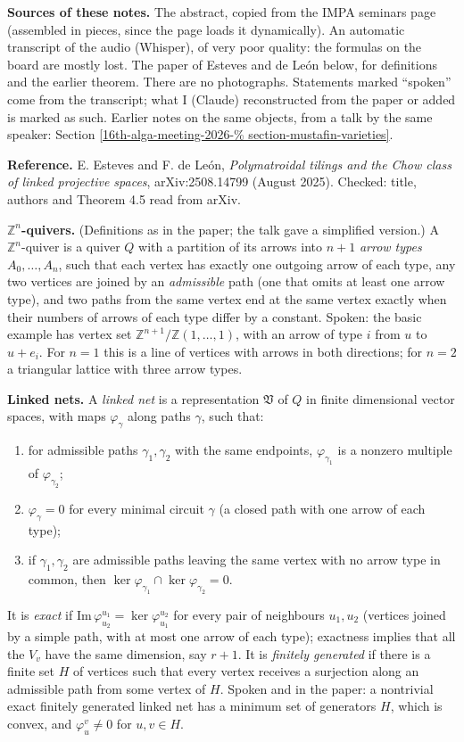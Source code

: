\medskip\noindent
{\bf Sources of these notes.} The abstract,
copied from the IMPA seminars page (assembled
in pieces, since the page loads it
dynamically). An automatic transcript of the
audio (Whisper), of very poor quality: the
formulas on the board are mostly lost. The
paper of Esteves and de Le\'on below, for
definitions and the earlier theorem. There
are no photographs. Statements marked
``spoken'' come from the transcript; what I
(Claude) reconstructed from the paper or
added is marked as such. Earlier notes on the
same objects, from a talk by the same
speaker: Section
\ref{16th-alga-meeting-2026-%
section-mustafin-varieties}.

\medskip\noindent
{\bf Reference.} E. Esteves and F. de Le\'on,
\emph{Polymatroidal tilings and the Chow
class of linked projective spaces},
arXiv:2508.14799 (August 2025). Checked:
title, authors and Theorem 4.5 read from
arXiv.

\medskip\noindent
{\bf $\mathbb{Z}^n$-quivers.} (Definitions as
in the paper; the talk gave a simplified
version.) A $\mathbb{Z}^n$-quiver is a quiver
$Q$ with a partition of its arrows into $n+1$
\emph{arrow types} $A_0,\dots,A_n$, such that
each vertex has exactly one outgoing arrow of
each type, any two vertices are joined by an
\emph{admissible} path (one that omits at
least one arrow type), and two paths from the
same vertex end at the same vertex exactly
when their numbers of arrows of each type
differ by a constant. Spoken: the basic
example has vertex set
$\mathbb{Z}^{n+1}/\mathbb{Z}(1,\dots,1)$,
with an arrow of type $i$ from $u$ to
$u+e_i$. For $n=1$ this is a line of vertices
with arrows in both directions; for $n=2$ a
triangular lattice with three arrow types.

\medskip\noindent
{\bf Linked nets.} A \emph{linked net} is a
representation $\mathfrak{V}$ of $Q$ in
finite dimensional vector spaces, with maps
$\varphi_\gamma$ along paths $\gamma$, such
that:
\begin{enumerate}
\item for admissible paths
$\gamma_1,\gamma_2$ with the same endpoints,
$\varphi_{\gamma_1}$ is a nonzero multiple of
$\varphi_{\gamma_2}$;
\item $\varphi_\gamma=0$ for every minimal
circuit $\gamma$ (a closed path with one
arrow of each type);
\item if $\gamma_1,\gamma_2$ are admissible
paths leaving the same vertex with no arrow
type in common, then
$\ker\varphi_{\gamma_1}\cap
\ker\varphi_{\gamma_2}=0$.
\end{enumerate}
It is \emph{exact} if
$\mathrm{Im}\,\varphi^{u_1}_{u_2}=
\ker\varphi^{u_2}_{u_1}$
for every pair of neighbours $u_1,u_2$
(vertices joined by a simple path, with at
most one arrow of each type); exactness
implies that all the $V_v$ have the same
dimension, say $r+1$. It is \emph{finitely
generated} if there is a finite set $H$ of
vertices such that every vertex receives a
surjection along an admissible path from some
vertex of $H$. Spoken and in the paper: a
nontrivial exact finitely generated linked
net has a minimum set of generators $H$,
which is convex, and $\varphi^v_u\neq 0$ for
$u,v\in H$.

